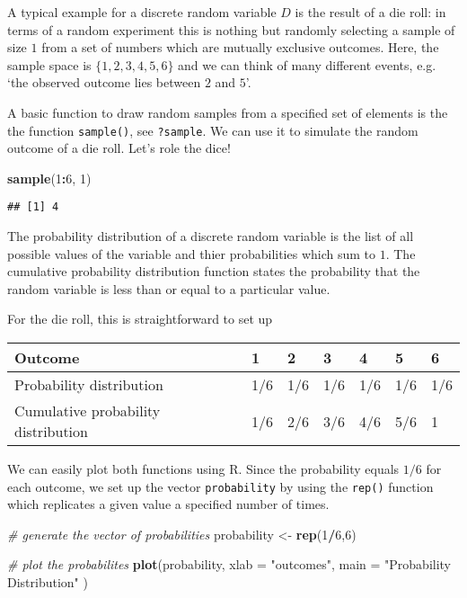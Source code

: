 \documentclass[]{book}
\newenvironment{Shaded}{\begin{snugshade}}{\end{snugshade}}
\newcommand{\KeywordTok}[1]{\textcolor[rgb]{0.13,0.29,0.53}{\textbf{#1}}}
\newcommand{\DataTypeTok}[1]{\textcolor[rgb]{0.13,0.29,0.53}{#1}}
\newcommand{\DecValTok}[1]{\textcolor[rgb]{0.00,0.00,0.81}{#1}}
\newcommand{\StringTok}[1]{\textcolor[rgb]{0.31,0.60,0.02}{#1}}
\newcommand{\CommentTok}[1]{\textcolor[rgb]{0.56,0.35,0.01}{\textit{#1}}}
\newcommand{\OperatorTok}[1]{\textcolor[rgb]{0.81,0.36,0.00}{\textbf{#1}}}
\newcommand{\NormalTok}[1]{#1}
\theoremstyle{definition}
\theoremstyle{definition}
\theoremstyle{definition}
\theoremstyle{remark}
\begin{document}
A typical example for a discrete random variable \(D\) is the result of
a die roll: in terms of a random experiment this is nothing but randomly
selecting a sample of size \(1\) from a set of numbers which are
mutually exclusive outcomes. Here, the sample space is
\(\{1,2,3,4,5,6\}\) and we can think of many different events, e.g. `the
observed outcome lies between \(2\) and \(5\)'.

A basic function to draw random samples from a specified set of elements
is the the function \texttt{sample()}, see \texttt{?sample}. We can use
it to simulate the random outcome of a die roll. Let's role the dice!

\begin{Shaded}
\begin{Highlighting}[]
\KeywordTok{sample}\NormalTok{(}\DecValTok{1}\OperatorTok{:}\DecValTok{6}\NormalTok{, }\DecValTok{1}\NormalTok{) }
\end{Highlighting}
\end{Shaded}

\begin{verbatim}
## [1] 4
\end{verbatim}

The probability distribution of a discrete random variable is the list
of all possible values of the variable and thier probabilities which sum
to \(1\). The cumulative probability distribution function states the
probability that the random variable is less than or equal to a
particular value.

For the die roll, this is straightforward to set up

\begin{longtable}[]{@{}lllllll@{}}
\toprule
Outcome & 1 & 2 & 3 & 4 & 5 & 6\tabularnewline
\midrule
\endhead
Probability distribution & 1/6 & 1/6 & 1/6 & 1/6 & 1/6 &
1/6\tabularnewline
Cumulative probability distribution & 1/6 & 2/6 & 3/6 & 4/6 & 5/6 &
1\tabularnewline
\bottomrule
\end{longtable}

We can easily plot both functions using R. Since the probability equals
\(1/6\) for each outcome, we set up the vector \texttt{probability} by
using the \texttt{rep()} function which replicates a given value a
specified number of times.

\begin{Shaded}
\begin{Highlighting}[]
\CommentTok{# generate the vector of probabilities }
\NormalTok{probability <-}\StringTok{ }\KeywordTok{rep}\NormalTok{(}\DecValTok{1}\OperatorTok{/}\DecValTok{6}\NormalTok{,}\DecValTok{6}\NormalTok{) }

\CommentTok{# plot the probabilites }
\KeywordTok{plot}\NormalTok{(probability, }\DataTypeTok{xlab =} \StringTok{"outcomes"}\NormalTok{, }
     \DataTypeTok{main =} \StringTok{"Probability Distribution"}
\NormalTok{     ) }
\end{Highlighting}
\end{Shaded}
\end{document}
